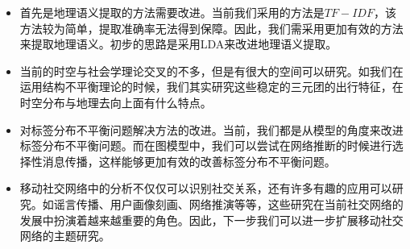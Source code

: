 \begin{itemize}
    \item 首先是地理语义提取的方法需要改进。当前我们采用的方法是$TF-IDF$，该方法较为简单，提取准确率无法得到保障。因此，我们需采用更加有效的方法来提取地理语义。初步的思路是采用LDA来改进地理语义提取。
    \item 当前的时空与社会学理论交叉的不多，但是有很大的空间可以研究。如我们在运用结构不平衡理论的时候，我们其实研究这些稳定的三元团的出行特征，在时空分布与地理去向上面有什么特点。 
    \item 对标签分布不平衡问题解决方法的改进。当前，我们都是从模型的角度来改进标签分布不平衡问题。而在图模型中，我们可以尝试在网络推断的时候进行选择性消息传播，这样能够更加有效的改善标签分布不平衡问题。 
    
    \item 移动社交网络中的分析不仅仅可以识别社交关系，还有许多有趣的应用可以研究。如谣言传播、用户画像刻画、网络推演等等，这些研究在当前社交网络的发展中扮演着越来越重要的角色。因此，下一步我们可以进一步扩展移动社交网络的主题研究。
\end{itemize}




































